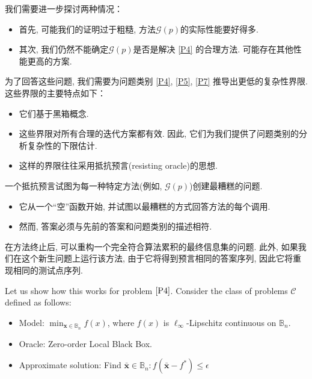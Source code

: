 我们需要进一步探讨两种情况：
\begin{itemize}
    \item 首先, 可能我们的证明过于粗糙, 方法$\mathcal{G}(p)$的实际性能要好得多. 
    \item 其次, 我们仍然不能确定$\mathcal{G}(p)$是否是解决 \ref{P4} 的合理方法. 可能存在其他性能更高的方案. 
\end{itemize}
为了回答这些问题, 我们需要为问题类别 \ref{P4}, \ref{P5}, \ref{P7} 推导出更低的复杂性界限. 这些界限的主要特点如下：
\begin{itemize}
    \item 它们基于黑箱概念. 
    \item 这些界限对所有合理的迭代方案都有效. 因此, 它们为我们提供了问题类别的分析复杂性的下限估计. 
    \item 这样的界限往往采用抵抗预言(resisting oracle)的思想. 
\end{itemize}

一个抵抗预言试图为每一种特定方法(例如, $\mathcal{G}(p)$)创建最糟糕的问题. 
\begin{itemize}
    \item 它从一个``空''函数开始, 并试图以最糟糕的方式回答方法的每个调用. 
    \item 然而, 答案必须与先前的答案和问题类别的描述相符. 
\end{itemize}
在方法终止后, 可以重构一个完全符合算法累积的最终信息集的问题. 此外, 如果我们在这个新生问题上运行该方法, 由于它将得到预言相同的答案序列, 因此它将重现相同的测试点序列. 

Let us show how this works for problem $\ref{P4}$. Consider the class of problems $\mathcal{C}$ defined as follows:
\begin{itemize}
    \item Model: $\min_{\bm x\in \mathbb{B}_n}f(x)$, where $f(x)$ is $\ell_\infty$-Lipschitz continuous on $\mathbb{B}_n$. 
    \item Oracle: Zero-order Local Black Box.
    \item Approximate solution: Find $\bar{\bm x}\in \mathbb{B}_n:f(\bar{\bm x}-f^*)\le \epsilon$
\end{itemize}

